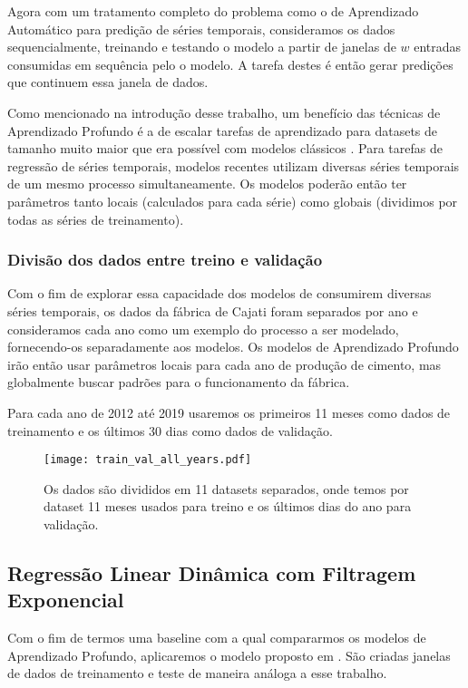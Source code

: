Agora com um tratamento completo do problema como o de Aprendizado Automático para predição de séries
temporais, consideramos os dados sequencialmente, treinando e testando o modelo a partir de janelas de $w$
entradas consumidas em sequência pelo o modelo. A tarefa destes é então gerar
predições que continuem essa janela de dados. 

Como mencionado na introdução desse trabalho, um benefício das técnicas de
Aprendizado Profundo é a de escalar tarefas de aprendizado para datasets de
tamanho muito maior que era possível com modelos clássicos \citep{dlbook}.
Para tarefas de regressão de séries temporais, modelos recentes utilizam
diversas séries temporais de um mesmo processo simultaneamente.
Os modelos poderão então ter parâmetros tanto locais (calculados
para cada série) como globais (dividimos por todas as séries de treinamento).

\subsubsection{Divisão dos dados entre treino e validação}

Com o fim de explorar essa capacidade dos modelos de consumirem diversas séries
temporais, os dados da fábrica de Cajati foram separados por ano e consideramos
cada ano como um exemplo do processo a ser modelado, fornecendo-os separadamente
aos modelos. Os modelos de Aprendizado
Profundo irão então usar parâmetros locais para cada ano de produção de cimento,
mas globalmente buscar padrões para o funcionamento da fábrica. 

Para cada ano de 2012 até 2019 usaremos os primeiros 11 meses como dados de
treinamento e os últimos 30 dias como dados de validação.


\begin{figure}[H]
  \centering
  \texttt{[image: train\_val\_all\_years.pdf]} 
  \caption{Os dados são divididos em 11 datasets separados, onde temos por
    dataset 11 meses usados para treino e os últimos dias do ano para validação.} 
  \label{fig:trainvalallyears}
\end{figure}

\subsection{Regressão Linear Dinâmica com Filtragem Exponencial}

Com o fim de termos uma baseline com a qual compararmos os modelos de
Aprendizado Profundo, aplicaremos o modelo proposto em \citep{grecialin}.
São criadas janelas de dados de treinamento e teste de maneira análoga a esse trabalho.


